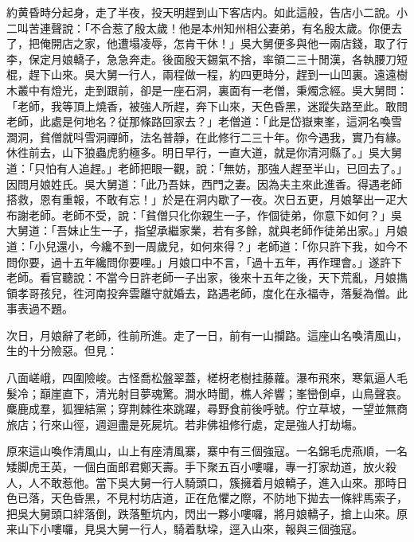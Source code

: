 約黄昏時分起身，走了半夜，投天明趕到山下客店内。如此這般，告店小二說。小二叫苦連聲說：「不合惹了殷太歲！他是本州知州相公妻弟，有名殷太歲。你便去了，把俺開店之家，他遭塌凌辱，怎肯干休！」吳大舅便多與他一兩店錢，取了行李，保定月娘轎子，急急奔走。後面殷天錫氣不捨，率領二三十閒漢，各執腰刀短棍，趕下山來。吳大舅一行人，兩程做一程，約四更時分，趕到一山凹裏。遠遠樹木叢中有燈光，走到跟前，卻是一座石洞，裏面有一老僧，秉燭念經。吳大舅問：「老師，我等頂上燒香，被強人所趕，奔下山來，天色昏黑，迷蹤失路至此。敢問老師，此處是何地名？従那條路回家去？」老僧道：「此是岱嶽東峯，這洞名喚雪澗洞，貧僧就呌雪洞禪師，法名普靜，在此修行二三十年。你今遇我，實乃有緣。休徃前去，山下狼蟲虎豹極多。明日早行，一直大道，就是你清河縣了。」吳大舅道：「只怕有人追趕。」老師把眼一觀，說：「無妨，那強人趕至半山，已回去了。」因問月娘姓氏。吳大舅道：「此乃吾妹，西門之妻。因為夫主來此進香。得遇老師搭救，恩有重報，不敢有忘！」於是在洞内歇了一夜。次日五更，月娘拏出一疋大布謝老師。老師不受，說：「貧僧只化你親生一子，作個徒弟，你意下如何？」吳大舅道：「吾妹止生一子，指望承繼家業，若有多餘，就與老師作徒弟出家。」月娘道：「小兒還小，今纔不到一周歲兒，如何來得？」老師道：「你只許下我，如今不問你要，過十五年纔問你要哩。」月娘口中不言，「過十五年，再作理會。」遂許下老師。看官聽說：不當今日許老師一子出家，後來十五年之後，天下荒亂，月娘㩦領孝哥孩兒，徃河南投奔雲離守就婚去，路遇老師，度化在永福寺，落髮為僧。此事表過不題。

次日，月娘辭了老師，徃前所進。走了一日，前有一山攔路。這座山名喚清風山，生的十分險惡。但見：

\begin{myquote}
八面嵯峨，四圍險峻。古怪喬松盤翠蓋，槎枒老樹挂藤蘿。瀑布飛來，寒氣逼人毛髮冷；巔崖直下，清光射目夢魂驚。澗水時聞，樵人斧響；峯巒倒卓，山鳥聲哀。麋鹿成羣，狐狸結黨；穿荆棘徃來跳躍，尋野食前後呼號。佇立草坡，一望並無商旅店；行來山徑，週迴盡是死屍坑。若非佛祖修行處，定是強人打劫塲。
\end{myquote}

原來這山喚作清風山，山上有座清風寨，寨中有三個強寇。一名錦毛虎燕順，一名矮脚虎王英，一個白面郎君鄭天壽。手下聚五百小嘍囉，專一打家劫道，放火殺人，人不敢惹他。當下吳大舅一行人騎頭口，簇擁着月娘轎子，進入山來。那時日色已落，天色昏黑，不見村坊店道，正在危懼之際，不防地下拋去一條絆馬索子，把吳大舅頭口絆落倒，跌落塹坑内，閃出一夥小嘍囉，將月娘轎子，搶上山來。原来山下小嘍囉，見吳大舅一行人，騎着馱垜，逕入山來，報與三個強寇。

